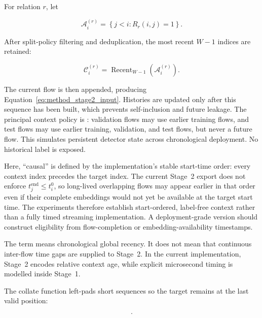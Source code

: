 \documentclass[11pt,fleqn]{report}
\begin{document}
For relation $r$, let

\begin{equation}
    \mathcal{A}^{(r)}_i
    =\left\{j<i:R_r(i,j)=1\right\}.
    \label{eq:method_eligible_context}
\end{equation}

After split-policy filtering and deduplication, the most recent $W-1$ indices are retained:

\begin{equation}
    \mathcal{C}^{(r)}_i
    =\operatorname{Recent}_{W-1}
      \left(\mathcal{A}^{(r)}_i\right).
    \label{eq:recent_context}
\end{equation}

The current flow is then appended, producing Equation~\ref{eq:method_stage2_input}. Histories are updated only after this sequence has been built, which prevents self-inclusion and future leakage. The principal context policy is : validation flows may use earlier training flows, and test flows may use earlier training, validation, and test flows, but never a future flow. This simulates persistent detector state across chronological deployment. No historical label is exposed.

Here, ``causal'' is defined by the implementation's stable start-time order: every context index precedes the target index. The current Stage~2 export does not enforce $t_j^{\mathrm{end}}\leq t_i^{0}$, so long-lived overlapping flows may appear earlier in that order even if their complete embeddings would not yet be available at the target start time. The experiments therefore establish start-ordered, label-free context rather than a fully timed streaming implementation. A deployment-grade version should construct eligibility from flow-completion or embedding-availability timestamps.

The term  means chronological global recency. It does not mean that continuous inter-flow time gaps are supplied to Stage~2. In the current implementation, Stage~2 encodes relative context age, while explicit microsecond timing is modelled inside Stage~1.

The collate function left-pads short sequences so the target remains at the last valid position:

\begin{equation}
    [\mathrm{PAD},\ldots,\mathrm{PAD},
      \mathbf{z}^{(1)}_{j_1},\ldots,
      \mathbf{z}^{(1)}_{j_{K_i}},
      \mathbf{z}^{(1)}_i].
    \label{eq:left_padded_context}
\end{equation}
\end{document}
